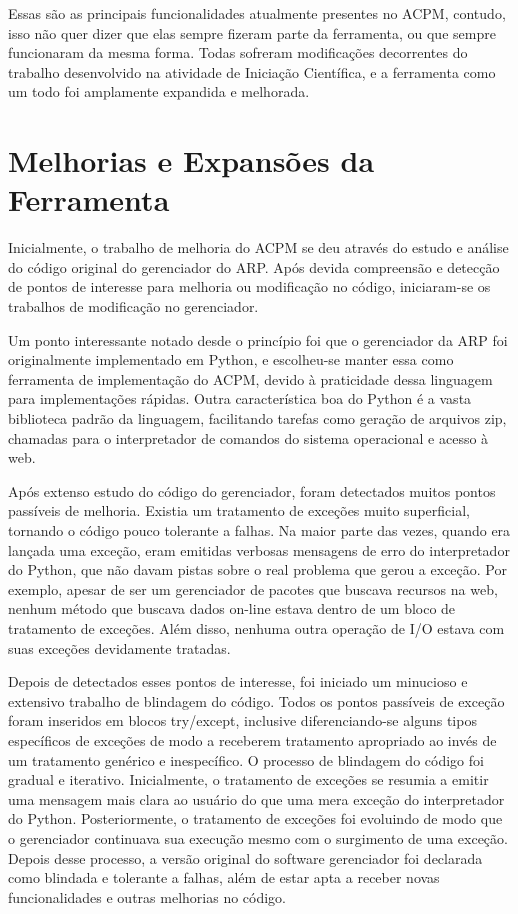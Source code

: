 \documentclass[12pt]{article}
\begin{document}
Essas são as principais funcionalidades atualmente presentes no ACPM, contudo,
isso não quer dizer que elas sempre fizeram parte da ferramenta, ou que sempre
funcionaram da mesma forma. Todas sofreram modificações decorrentes do trabalho
desenvolvido na atividade de Iniciação Científica, e a ferramenta como um todo
foi amplamente expandida e melhorada.

\section{Melhorias e Expansões da Ferramenta}

Inicialmente, o trabalho de melhoria do ACPM se deu através do estudo e análise
do código original do gerenciador do ARP. Após devida compreensão e detecção de
pontos de interesse para melhoria ou modificação no código, iniciaram-se os
trabalhos de modificação no gerenciador.

Um ponto interessante notado desde o princípio foi que o gerenciador da ARP foi
originalmente implementado em Python, e escolheu-se manter essa como ferramenta
de implementação do ACPM, devido à praticidade dessa linguagem para
implementações rápidas. Outra característica boa do Python é a vasta biblioteca
padrão da linguagem, facilitando tarefas como geração de arquivos zip, chamadas
para o interpretador de comandos do sistema operacional e acesso à web.

Após extenso estudo do código do gerenciador, foram detectados muitos pontos
passíveis de melhoria. Existia um tratamento de exceções muito superficial,
tornando o código pouco tolerante a falhas. Na maior parte das vezes, quando era
lançada uma exceção, eram emitidas verbosas mensagens de erro do interpretador
do Python, que não davam pistas sobre o real problema que gerou a exceção. Por
exemplo, apesar de ser um gerenciador de pacotes que buscava recursos na web,
nenhum método que buscava dados on-line estava dentro de um bloco de tratamento
de exceções. Além disso, nenhuma outra operação de I/O estava com suas exceções
devidamente tratadas.

Depois de detectados esses pontos de interesse, foi iniciado um minucioso e
extensivo trabalho de blindagem do código. Todos os pontos passíveis de exceção
foram inseridos em blocos try/except, inclusive diferenciando-se alguns tipos
específicos de exceções de modo a receberem tratamento apropriado ao invés de um
tratamento genérico e inespecífico. O processo de blindagem do código foi
gradual e iterativo. Inicialmente, o tratamento de exceções se resumia a emitir
uma mensagem mais clara ao usuário do que uma mera exceção do interpretador do
Python. Posteriormente, o tratamento de exceções foi evoluindo de modo que o
gerenciador continuava sua execução mesmo com o surgimento de uma exceção.
Depois desse processo, a versão original do software gerenciador foi declarada
como blindada e tolerante a falhas, além de estar apta a receber novas
funcionalidades e outras melhorias no código.
\end{document}
